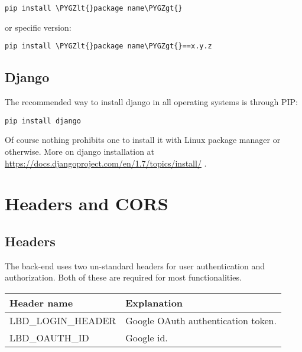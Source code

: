\documentclass[letterpaper,10pt,english]{sphinxmanual}
\def\PYGZlt{\char`\<}
\def\PYGZgt{\char`\>}
\begin{document}
\begin{Verbatim}[commandchars=\\\{\}]
pip install \PYGZlt{}package name\PYGZgt{}
\end{Verbatim}

or specific version:

\begin{Verbatim}[commandchars=\\\{\}]
pip install \PYGZlt{}package name\PYGZgt{}==x.y.z
\end{Verbatim}


\section{Django}
\label{installation:django}
The recommended way to install django in all operating systems is through PIP:

\begin{Verbatim}[commandchars=\\\{\}]
pip install django
\end{Verbatim}

Of course nothing prohibits one to install it with Linux package manager or otherwise. More on django installation at
\href{https://docs.djangoproject.com/en/1.7/topics/install/}{https://docs.djangoproject.com/en/1.7/topics/install/} .


\chapter{Headers and CORS}
\label{headersandcors:headers-and-cors}\label{headersandcors::doc}

\section{Headers}
\label{headersandcors:headers}
The back-end uses two un-standard headers for user authentication and authorization. Both of these are required for most
functionalities.

\begin{tabulary}{\linewidth}{|L|L|}
\hline
\textsf{\relax 
Header name
} & \textsf{\relax 
Explanation
}\\
\hline
LBD\_LOGIN\_HEADER
 & 
Google OAuth authentication token.
\\

LBD\_OAUTH\_ID
 & 
Google id.
\\
\hline\end{tabulary}
\end{document}

